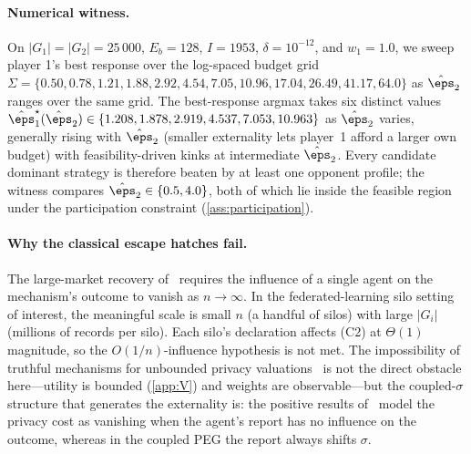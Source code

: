 \paragraph{Numerical witness.}
\label{ex:witness}
On $|G_1| = |G_2| = 25\,000$, $E_b = 128$, $I = 1953$,
$\delta = 10^{-12}$, and $w_1 = 1.0$, we sweep player 1's best response
over the log-spaced budget grid
$\Sigma = \{0.50, 0.78, 1.21, 1.88, 2.92, 4.54, 7.05, 10.96, 17.04,
26.49, 41.17, 64.0\}$ as $\hat\eps_2$ ranges over the same grid. The
best-response argmax takes six distinct values
$\hat\eps_1^\star(\hat\eps_2) \in \{1.208, 1.878, 2.919, 4.537, 7.053,
10.963\}$ as $\hat\eps_2$ varies, generally rising with $\hat\eps_2$
(smaller externality lets player~1 afford a larger own budget) with
feasibility-driven kinks at intermediate $\hat\eps_2$. Every candidate
dominant strategy is therefore beaten by at least one opponent
profile; the witness compares $\hat\eps_2 \in \{0.5, 4.0\}$, both of
which lie inside the feasible region under the participation
constraint (\cref{ass:participation}).

\paragraph{Why the classical escape hatches fail.}
The large-market recovery of~\cite{kearns2014mechanism} requires the
influence of a single agent on the mechanism's outcome to vanish as
$n \to \infty$. In the federated-learning silo setting of interest, the
meaningful scale is small $n$ (a handful of silos) with large $|G_i|$
(millions of records per silo). Each silo's declaration affects
\textup{(C2)} at $\Theta(1)$ magnitude, so the $O(1/n)$-influence
hypothesis is not met. The impossibility of truthful mechanisms for
unbounded privacy valuations~\cite{nissim2014redrawing,ghosh2011selling}
is not the direct obstacle here---utility is bounded (\cref{app:V})
and weights are observable---but the coupled-$\sigma$ structure that
generates the externality is: the positive results
of~\cite{chen2013truthful} model the privacy cost as vanishing when
the agent's report has no influence on the outcome, whereas in the
coupled PEG the report always shifts $\sigma$.

